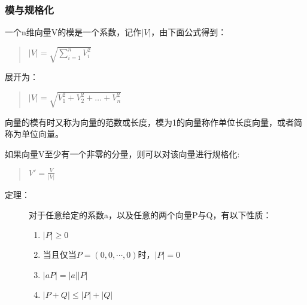 \documentclass[a4paper,10pt]{article}
\begin{document}
\begin{CJK}{UTF8}{song}
\subsubsection{模与规格化}
一个n维向量V的模是一个系数，记作$|V|$，由下面公式得到：
\begin{quote}
$|V|=\sqrt{\sum_{i=1}^{n}V_{i}^{2}}$
\end{quote}
展开为：
\begin{quote}
$|V|=\sqrt{V_{1}^{2}+V_{2}^{2}+\ldots{}+V_{n}^{2}} $
\end{quote}
向量的模有时又称为向量的范数或长度，模为1的向量称作单位长度向量，或者简称为单位向量。

如果向量V至少有一个非零的分量，则可以对该向量进行规格化:
\begin{quote}
$V'=\frac{V}{|V|}$
\end{quote}
\begin{description}
\item[定理：]对于任意给定的系数a，以及任意的两个向量P与Q，有以下性质：
\begin{enumerate}
\item $|P|\ge{}0$
\item 当且仅当$P=(0,0,\cdots{},0)$时，$|P|=0$
\item $|aP|=|a||P|$
\item $|P+Q|\le{}|P|+|Q|$
\end{enumerate}
\end{description}



\end{CJK}
\end{document}
